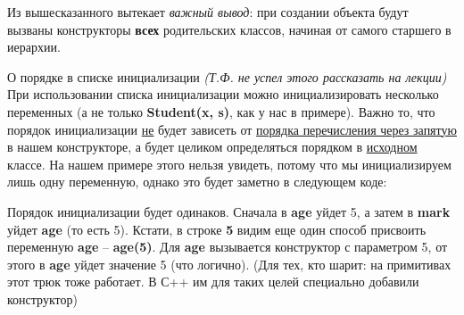 \begin{lecture}[\lectureSubject]
\begin{lecSection}
			Из вышесказанного вытекает \textit{важный вывод}: при создании объекта будут вызваны конструкторы \textbf{всех} родительских классов, начиная от самого старшего в иерархии.
			
			\begin{lecSubsection}{О порядке в списке инициализации}
			\textit{(Т.Ф. не успел этого рассказать на лекции)} При использовании списка инициализации можно инициализировать несколько переменных (а не только \textbf{Student(x, s)}, как у нас в примере). Важно то, что порядок инициализации \underline{не} будет зависеть от \underline{порядка перечисления через запятую} в нашем конструкторе, а будет целиком определяться порядком в \underline{исходном} классе. На нашем примере этого нельзя увидеть, потому что мы инициализируем лишь одну переменную, однако это будет заметно в следующем коде:
			\end{lecSubsection}
			Порядок инициализации будет одинаков. Сначала в \textbf{age} уйдет 5, а затем в \textbf{mark} уйдет \textbf{age} (то есть 5). Кстати, в строке \textbf{5} видим еще один способ присвоить переменную \textbf{age} -- \textbf{age(5)}. Для \textbf{age} вызывается конструктор с параметром 5, от этого в \textbf{age} уйдет значение 5 (что логично). (Для тех, кто шарит: на примитивах этот трюк тоже работает. В С++ им для таких целей специально добавили конструктор)
		
	\end{lecSection}
\end{lecture}
